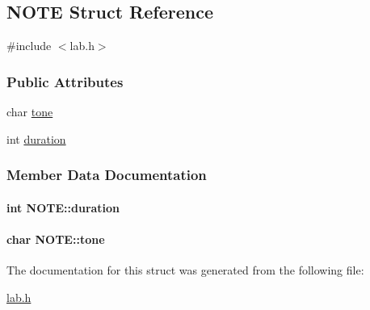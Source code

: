 \hypertarget{structNOTE}{\subsection{N\+O\+T\+E Struct Reference}
\label{structNOTE}
}


{\ttfamily \#include $<$lab.\+h$>$}

\subsubsection*{Public Attributes}
\begin{DoxyCompactItemize}
\item 
char \hyperlink{structNOTE_ae03dbb1306465fe61ec10da05fa5782e}{tone}
\item 
int \hyperlink{structNOTE_a258adf07267f95ab9630b33bad1b2fe2}{duration}
\end{DoxyCompactItemize}


\subsubsection{Member Data Documentation}
\hypertarget{structNOTE_a258adf07267f95ab9630b33bad1b2fe2}{
\paragraph[{duration}]{\setlength{\rightskip}{0pt plus 5cm}int N\+O\+T\+E\+::duration}}\label{structNOTE_a258adf07267f95ab9630b33bad1b2fe2}
\hypertarget{structNOTE_ae03dbb1306465fe61ec10da05fa5782e}{
\paragraph[{tone}]{\setlength{\rightskip}{0pt plus 5cm}char N\+O\+T\+E\+::tone}}\label{structNOTE_ae03dbb1306465fe61ec10da05fa5782e}


The documentation for this struct was generated from the following file\+:\begin{DoxyCompactItemize}
\item 
\hyperlink{lab_8h}{lab.\+h}\end{DoxyCompactItemize}
